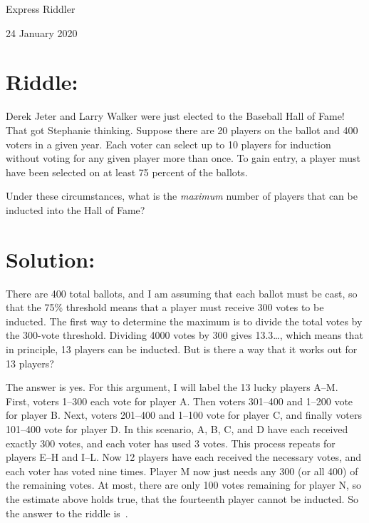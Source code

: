 \documentclass{article}
\begin{document}
\pagestyle{empty} %

\begin{center}
{\LARGE Express Riddler}

\vspace{0.15in}

{\Large 24 January 2020}
\end{center}


\section*{Riddle:}

Derek Jeter and Larry Walker were just elected to the Baseball Hall of Fame!
That got Stephanie thinking.
Suppose there are 20 players on the ballot and 400 voters in a given year.
Each voter can select up to 10 players for induction without voting for any given player more than once.
To gain entry, a player must have been selected on at least 75 percent of the ballots.

Under these circumstances, what is the \textit{maximum} number of players that can be inducted into the Hall of Fame?


\section*{Solution:}

There are 400 total ballots, and I am assuming that each ballot must be cast, so that the 75\% threshold means that a player must receive 300 votes to be inducted.
The first way to determine the maximum is to divide the total votes by the 300-vote threshold.
Dividing 4000 votes by 300 gives 13.3\dots, which means that in principle, 13 players can be inducted.
But is there a way that it works out for 13 players?

The answer is yes.
For this argument, I will label the 13 lucky players A--M.
First, voters 1--300 each vote for player A.
Then voters 301--400 and 1--200 vote for player B.
Next, voters 201--400 and 1--100 vote for player C, and finally voters 101--400 vote for player D.
In this scenario, A, B, C, and D have each received exactly 300 votes, and each voter has used 3 votes.
This process repeats for players E--H and I--L.
Now 12 players have each received the necessary votes, and each voter has voted nine times.
Player M now just needs any 300 (or all 400) of the remaining votes.
At most, there are only 100 votes remaining for player N, so the estimate above holds true, that the fourteenth player cannot be inducted.
So the answer to the riddle is
\,.
\end{document}
